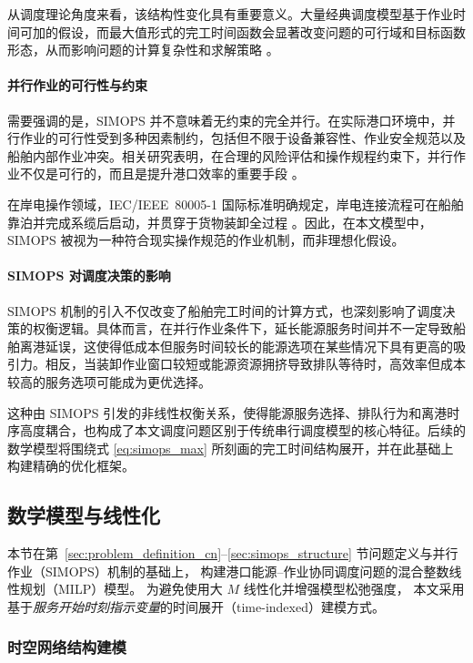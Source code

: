 \documentclass[UTF8, a4paper, 12pt]{ctexart}
\begin{document}
从调度理论角度来看，该结构性变化具有重要意义。大量经典调度模型基于作业时间可加的假设，而最大值形式的完工时间函数会显著改变问题的可行域和目标函数形态，从而影响问题的计算复杂性和求解策略 \cite{brucker2007scheduling,pinedo2016scheduling}。

\paragraph{并行作业的可行性与约束}
需要强调的是，SIMOPS 并不意味着无约束的完全并行。在实际港口环境中，并行作业的可行性受到多种因素制约，包括但不限于设备兼容性、作业安全规范以及船舶内部作业冲突。相关研究表明，在合理的风险评估和操作规程约束下，并行作业不仅是可行的，而且是提升港口效率的重要手段 \cite{fan2021simops}。

在岸电操作领域，IEC/IEEE~80005-1 国际标准明确规定，岸电连接流程可在船舶靠泊并完成系缆后启动，并贯穿于货物装卸全过程 \cite{IEC80005}。因此，在本文模型中，SIMOPS 被视为一种符合现实操作规范的作业机制，而非理想化假设。

\paragraph{SIMOPS 对调度决策的影响}
SIMOPS 机制的引入不仅改变了船舶完工时间的计算方式，也深刻影响了调度决策的权衡逻辑。具体而言，在并行作业条件下，延长能源服务时间并不一定导致船舶离港延误，这使得低成本但服务时间较长的能源选项在某些情况下具有更高的吸引力。相反，当装卸作业窗口较短或能源资源拥挤导致排队等待时，高效率但成本较高的服务选项可能成为更优选择。

这种由 SIMOPS 引发的非线性权衡关系，使得能源服务选择、排队行为和离港时序高度耦合，也构成了本文调度问题区别于传统串行调度模型的核心特征。后续的数学模型将围绕式 \eqref{eq:simops_max} 所刻画的完工时间结构展开，并在此基础上构建精确的优化框架。


\subsection{数学模型与线性化}
\label{sec:model_formulation}

本节在第~\ref{sec:problem_definition_cn}--\ref{sec:simops_structure} 节问题定义与并行作业（SIMOPS）机制的基础上，
构建港口能源--作业协同调度问题的混合整数线性规划（MILP）模型。
为避免使用大 $M$ 线性化并增强模型松弛强度，
本文采用基于\emph{服务开始时刻指示变量}的时间展开（time-indexed）建模方式。
\subsubsection{时空网络结构建模}
\end{document}
